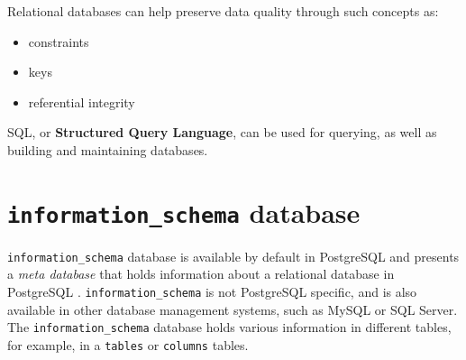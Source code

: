 \documentclass[11pt]{article}
\begin{document}
    Relational databases can help preserve data quality through such concepts as:

    \begin{itemize}
        \item constraints
        \item keys
        \item referential integrity
    \end{itemize}

    SQL, or \textbf{Structured Query Language}, can be used for querying, as well as building and maintaining databases.

    \section{\texttt{information\_schema} database} \label{sec:info_schema}

    \texttt{information\_schema} database is available by default in PostgreSQL and presents a \textit{meta database} that holds information about a relational database in PostgreSQL .
    \texttt{information\_schema} is not PostgreSQL specific, and is also available in other database management systems, such as MySQL or SQL Server.
    The \texttt{information\_schema} database holds various information in different tables, for example, in a \texttt{tables} or \texttt{columns} tables.
\end{document}
